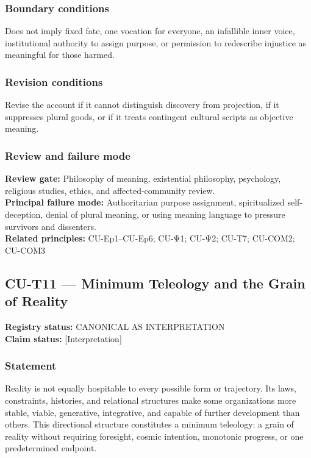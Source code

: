 \documentclass[
  11pt,
]{article}
\begin{document}
\subsubsection{Boundary conditions}\label{boundary-conditions-1}

Does not imply fixed fate, one vocation for everyone, an infallible
inner voice, institutional authority to assign purpose, or permission to
redescribe injustice as meaningful for those harmed.

\subsubsection{Revision conditions}\label{revision-conditions-1}

Revise the account if it cannot distinguish discovery from projection,
if it suppresses plural goods, or if it treats contingent cultural
scripts as objective meaning.

\subsubsection{Review and failure mode}\label{review-and-failure-mode-1}

\textbf{Review gate:} Philosophy of meaning, existential philosophy,
psychology, religious studies, ethics, and affected-community review.\\
\textbf{Principal failure mode:} Authoritarian purpose assignment,
spiritualized self-deception, denial of plural meaning, or using meaning
language to pressure survivors and dissenters.\\
\textbf{Related principles:} CU-Ep1--CU-Ep6; CU-Ψ1; CU-Ψ2; CU-T7;
CU-COM2; CU-COM3

\subsection{CU-T11 --- Minimum Teleology and the Grain of
Reality}\label{cu-t11-minimum-teleology-and-the-grain-of-reality}

\textbf{Registry status:} CANONICAL AS INTERPRETATION\\
\textbf{Claim status:} {[}Interpretation{]}

\subsubsection{Statement}\label{statement-60}

Reality is not equally hospitable to every possible form or trajectory.
Its laws, constraints, histories, and relational structures make some
organizations more stable, viable, generative, integrative, and capable
of further development than others. This directional structure
constitutes a minimum teleology: a grain of reality without requiring
foresight, cosmic intention, monotonic progress, or one predetermined
endpoint.
\end{document}
